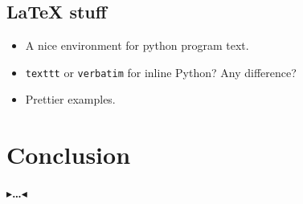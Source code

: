 \documentclass[11pt]{report}
\newcommand{\todo}[1]{{\color[rgb]{.5,0,0}\textbf{$\blacktriangleright$#1$\blacktriangleleft$}}}
\begin{document}
\section{\LaTeX{} stuff}

\begin{itemize}
  \item A nice environment for python program text.
  \item {\tt texttt} or \verb|verbatim| for inline Python? Any
    difference?
  \item Prettier examples.
\end{itemize}


\chapter{Conclusion}
\label{ch:conclusion}

\todo{\dots}
\end{document}
